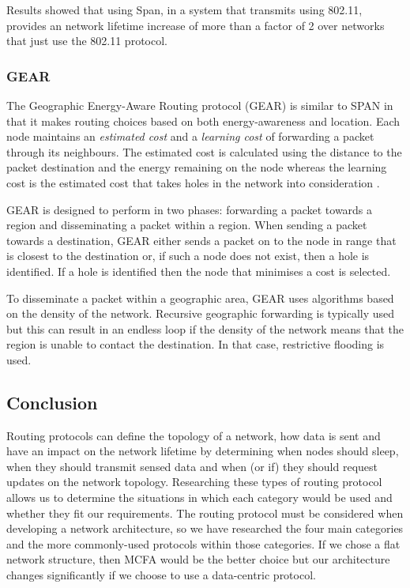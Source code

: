 Results showed that using Span, in a system that transmits using 802.11, provides an network lifetime increase of more than a factor of 2 over networks that just use the 802.11 protocol.

\subsubsection{GEAR}
The Geographic Energy-Aware Routing protocol (GEAR) is similar to SPAN in that it makes routing choices based on both energy-awareness and location. Each node maintains an \textit{estimated cost} and a \textit{learning cost} of forwarding a packet through its neighbours. The estimated cost is calculated using the distance to the packet destination and the energy remaining on the node whereas the learning cost is the estimated cost that takes holes in the network into consideration \cite{Yu2001}. 

GEAR is designed to perform in two phases: forwarding a packet towards a region and disseminating a packet within a region. When sending a packet towards a destination, GEAR either sends a packet on to the node in range that is closest to the destination or, if such a node does not exist, then a hole is identified. If a hole is identified then the node that minimises a cost is selected.

To disseminate a packet within a geographic area, GEAR uses algorithms based on the density of the network. Recursive geographic forwarding is typically used but this can result in an endless loop if the density of the network means that the region is unable to contact the destination. In that case, restrictive flooding is used.

\subsection{Conclusion}
Routing protocols can define the topology of a network, how data is sent and have an impact on the network lifetime by determining when nodes should sleep, when they should transmit sensed data and when (or if) they should request updates on the network topology. Researching these types of routing protocol allows us to determine the situations in which each category would be used and whether they fit our requirements. The routing protocol must be considered when developing a network architecture, so we have researched the four main categories and the more commonly-used protocols within those categories. If we chose a flat network structure, then MCFA would be the better choice but our architecture changes significantly if we choose to use a data-centric protocol. 

